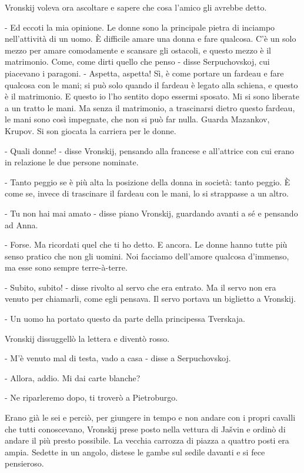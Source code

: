 Vronskij voleva ora ascoltare e sapere che cosa l'amico gli avrebbe detto. 

- Ed eccoti la mia opinione. Le donne sono la principale pietra di inciampo nell'attività di un uomo. È difficile amare una donna e fare qualcosa. C'è un solo mezzo per amare comodamente e scansare gli ostacoli, e questo mezzo è il matrimonio. Come, come dirti quello che penso - disse Serpuchovskoj, cui piacevano i paragoni. - Aspetta, aspetta! Sì, è come portare un fardeau e fare qualcosa con le mani; si può solo quando il fardeau è legato alla schiena, e questo è il matrimonio. E questo io l'ho sentito dopo essermi sposato. Mi si sono liberate a un tratto le mani. Ma senza il matrimonio, a trascinarsi dietro questo fardeau, le mani sono così impegnate, che non si può far nulla. Guarda Mazankov, Krupov. Si son giocata la carriera per le donne. 

- Quali donne! - disse Vronskij, pensando alla francese e all'attrice con cui erano in relazione le due persone nominate. 

- Tanto peggio se è più alta la posizione della donna in società: tanto peggio. È come se, invece di trascinare il fardeau con le mani, lo si strappasse a un altro. 

- Tu non hai mai amato - disse piano Vronskij, guardando avanti a sé e pensando ad Anna. 

- Forse. Ma ricordati quel che ti ho detto. E ancora. Le donne hanno tutte più senso pratico che non gli uomini. Noi facciamo dell'amore qualcosa d'immenso, ma esse sono sempre terre-à-terre. 

- Subito, subito! - disse rivolto al servo che era entrato. Ma il servo non era venuto per chiamarli, come egli pensava. Il servo portava un biglietto a Vronskij. 

- Un uomo ha portato questo da parte della principessa Tverskaja. 

Vronskij dissuggellò la lettera e diventò rosso. 

- M'è venuto mal di testa, vado a casa - disse a Serpuchovskoj. 

- Allora, addio. Mi dai carte blanche? 

- Ne riparleremo dopo, ti troverò a Pietroburgo. 

\label{xxii-2} 

Erano già le sei e perciò, per giungere in tempo e non andare con i propri cavalli che tutti conoscevano, Vronskij prese posto nella vettura di Jašvin e ordinò di andare il più presto possibile. La vecchia carrozza di piazza a quattro posti era ampia. Sedette in un angolo, distese le gambe sul sedile davanti e si fece pensieroso. 

